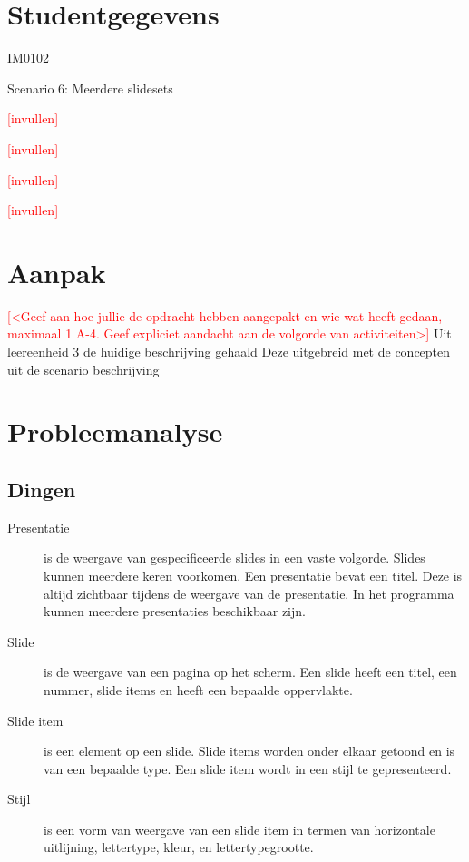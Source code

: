 \documentclass[a4paper]{article}
\newcommand{\todo}[1]{\textcolor{red}{[#1]}}
\begin{document}
\pagestyle{fancy}

\section*{Studentgegevens}
\begin{description}
	\item [Cursuscode] IM0102
	\item Scenario 6: Meerdere slidesets
	\item [Naam] \todo{invullen}
	\item [Studentnummer] \todo{invullen}
	\item [Naam] \todo{invullen}
	\item [Studentnummer] \todo{invullen}
\end{description}

\section*{Aanpak}
\todo{<Geef aan hoe jullie de opdracht hebben aangepakt en wie wat heeft gedaan, maximaal 1 A-4. Geef expliciet aandacht aan de volgorde van activiteiten>}
Uit leereenheid 3 de huidige beschrijving gehaald
Deze uitgebreid met de concepten uit de scenario beschrijving



\section{Probleemanalyse}
\subsection{Dingen}
\begin{description}
\item[Presentatie] is de weergave van gespecificeerde slides in een vaste volgorde. Slides kunnen meerdere keren voorkomen. Een presentatie bevat een titel. Deze is altijd zichtbaar tijdens de weergave van de presentatie. In het programma kunnen meerdere presentaties beschikbaar zijn.
\item[Slide] is de weergave van een pagina op het scherm. Een slide heeft een titel, een nummer, slide items en heeft een bepaalde oppervlakte.
\item[Slide item] is een element op een slide. Slide items worden onder elkaar getoond en is van een bepaalde type.
Een slide item wordt in een stijl te gepresenteerd.
\item[Stijl] is een vorm van weergave van een slide item in termen van horizontale uitlijning, lettertype, kleur, en lettertypegrootte.
\end{description}
\end{document}
